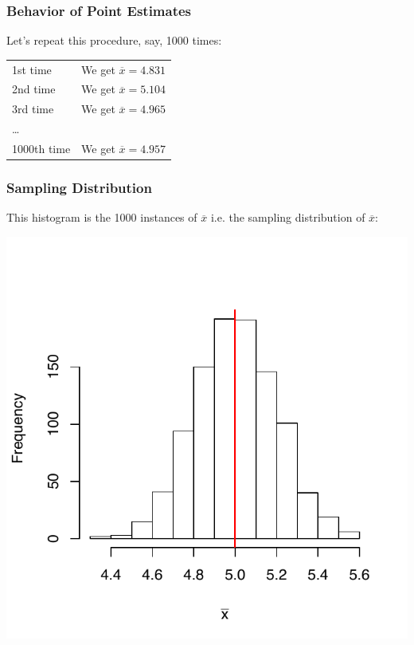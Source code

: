 \documentclass[handout]{beamer}
\newcommand{\blue}[1]{\textcolor{blue2}{#1}}
\newcommand{\xbar}{\overline{x}}
\begin{document}
\begin{frame}[fragile]
\frametitle{Behavior of Point Estimates}
Let's repeat this procedure, say, 1000 times:

\pause \begin{center}
\begin{tabular}{ll}
1st time & We get $\overline{x}=4.831$\\
2nd time & We get $\overline{x}=5.104$\\
3rd time & We get $\overline{x}=4.965$\\
\ldots & \\
1000th time & We get $\overline{x}=4.957$\\
\end{tabular}
\end{center}

\end{frame}


\begin{frame}[fragile]
\frametitle{Sampling Distribution}
This histogram is the 1000 instances of $\xbar$ i.e. the \blue{sampling distribution} of $\xbar$:
\begin{center}
\includegraphics{figure/lec12-001}
\end{center}
\end{frame}
\end{document}

